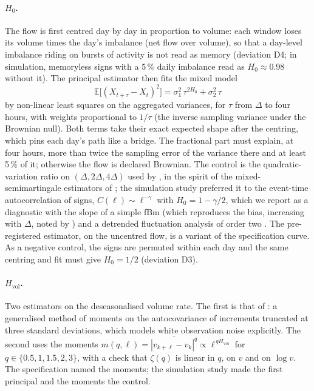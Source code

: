 \documentclass[11pt]{article}
\newcommand{\Hz}{H_0}
\newcommand{\Hv}{H_{\mathrm{vol}}}
\newcommand{\E}{\mathbb{E}}
\begin{document}
\paragraph{$\Hz$.} The flow is first centred day by day in proportion to volume: each
window loses its volume times the day's imbalance (net flow over volume), so that a
day-level imbalance riding on bursts of activity is not read as memory (deviation D4;
in simulation, memoryless signs with a 5\,\% daily imbalance read as $\Hz\approx0.98$
without it). The principal estimator then fits the mixed model
\[
\E\bigl[(X_{t+\tau}-X_t)^2\bigr]=\sigma_1^2\,\tau^{2\Hz}+\sigma_2^2\,\tau
\]
by non-linear least squares on the aggregated variances, for $\tau$ from $\Delta$ to four
hours, with weights proportional to $1/\tau$ (the inverse sampling variance under the
Brownian null). Both terms take their exact expected shape after the centring, which
pins each day's path like a bridge. The fractional part must explain, at four hours,
more than twice the sampling error of the variance there and at least 5\,\% of it;
otherwise the flow is declared Brownian. The control is the quadratic-variation ratio on $(\Delta,2\Delta,4\Delta)$
used by \citet{mocrs2026}, in the spirit of the mixed-semimartingale estimators of
\citet{chong2025}; the simulation study preferred it to the event-time autocorrelation
of signs, $C(\ell)\sim\ell^{-\gamma}$ with $\Hz=1-\gamma/2$, which we report as a
diagnostic with the slope of a simple fBm (which reproduces the bias, increasing with
$\Delta$, noted by \citet{mocrs2026}) and a detrended fluctuation analysis of order two
\citep{peng1994}. The pre-registered estimator, on the uncentred flow, is a variant of
the specification curve. As a negative control, the signs are permuted within each day
and the same centring and fit must give $\Hz=1/2$ (deviation D3).

\paragraph{$\Hv$.} Two estimators on the deseasonalised volume rate. The first is that of
\citet{mocrs2026}: a generalised method of moments \citep{lixiu2016} on the autocovariance
of increments truncated at three standard deviations, which models white observation
noise explicitly. The second uses the moments
$m(q,\ell)=\overline{|v_{k+\ell}-v_k|^q}\propto\ell^{\,q\Hv}$ for
$q\in\{0.5,1,1.5,2,3\}$, with a check that $\zeta(q)$ is linear in $q$, on $v$ and on
$\log v$. The specification named the moments; the simulation study made the first
principal and the moments the control.
\end{document}
